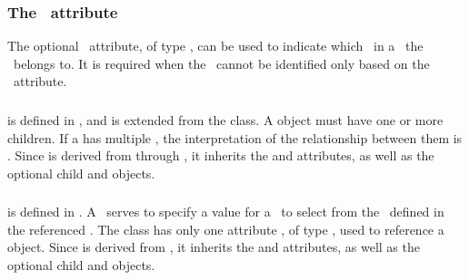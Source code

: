 \subsubsection{The \componentAtt\ attribute}
\label{def:SpeciesFeature:component}

The optional \componentAtt\ attribute, of type \SIdRefPT, can be used to indicate which \componentWR\ \mBlockChangedBegin{\revTwentyTwentyMarch}in\mBlockChangedEnd{\revTwentyTwentyMarch} a \species\ the \speciesFeature\ belongs to. It is required when the \component\ cannot be identified only based on the\\
\speciesFeatureTypeAtt\ attribute.

\subsubsection{}
\label{def:ListOfSpeciesFeatureValues}

 is defined in , and is extended from the  class. A \mBlockChangedBegin{\revTwentyTwentyMarch}  object\mBlockChangedEnd{\revTwentyTwentyMarch} must have one or more \SpeciesFeatureValue children. If a  has multiple \speciesFeatureValues, the interpretation of the relationship between them is . Since  is derived from  through , it inherits the  and  attributes, as well as the optional \mBlockChangedBegin{\revTwentyTwentyMarch}child\mBlockChangedEnd{\revTwentyTwentyMarch}  and  objects.

\subsubsection{}
\label{def:SpeciesFeatureValue}

 is defined in . A \speciesFeatureValue\ serves to specify a value for a \speciesFeature\ to select from the \listOfPossibleSpeciesFeatureValues\ defined in the referenced \speciesFeatureType. The  class has only one attribute , of type \SIdRefPT, used to reference a \PossibleSpeciesFeatureValue object. Since  is derived from , it inherits the  and  attributes, as well as the optional \mBlockChangedBegin{\revTwentyTwentyMarch}child\mBlockChangedEnd{\revTwentyTwentyMarch}  and  objects. 


